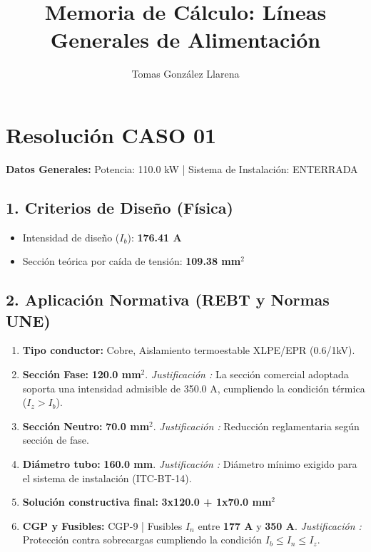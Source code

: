 \documentclass{article}
\begin{document}
\title{Memoria de Cálculo: Líneas Generales de Alimentación}
\author{Tomas González Llarena}
\maketitle

\section*{Resolución CASO 01}
\textbf{Datos Generales:} Potencia: 110.0 kW | Sistema de Instalación: ENTERRADA

\subsection*{1. Criterios de Diseño (Física)}
\begin{itemize}
    \item Intensidad de diseño ($I_b$): \textbf{176.41 A}
    \item Sección teórica por caída de tensión: \textbf{109.38 mm$^2$}
\end{itemize}

\subsection*{2. Aplicación Normativa (REBT y Normas UNE)}
\begin{enumerate}
    \item \textbf{Tipo conductor:} Cobre, Aislamiento termoestable XLPE/EPR (0.6/1kV).
    \item \textbf{Sección Fase:} \textbf{120.0 mm$^2$}. \textit{Justificación \cite{une_hd_60364_5_52}:} La sección comercial adoptada soporta una intensidad admisible de 350.0 A, cumpliendo la condición térmica ($I_z > I_b$).
    \item \textbf{Sección Neutro:} \textbf{70.0 mm$^2$}. \textit{Justificación \cite{guia_bt_14}:} Reducción reglamentaria según sección de fase.
    \item \textbf{Diámetro tubo:} \textbf{160.0 mm}. \textit{Justificación \cite{rebt_rd842}:} Diámetro mínimo exigido para el sistema de instalación (ITC-BT-14).
    \item \textbf{Solución constructiva final:} \textbf{3x120.0 + 1x70.0 mm$^2$}
    \item \textbf{CGP y Fusibles:} CGP-9 | Fusibles $I_n$ entre \textbf{177 A} y \textbf{350 A}. \textit{Justificación \cite{rebt_rd842}:} Protección contra sobrecargas cumpliendo la condición $I_b \leq I_n \leq I_z$.
\end{enumerate}
\end{document}
